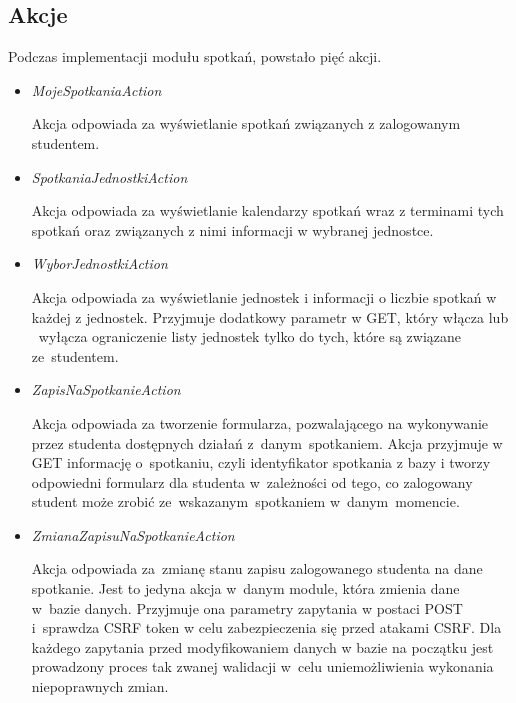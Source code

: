 \documentclass[licencjacka]{pracamgr}
\begin{document}
\subsection{Akcje}
Podczas implementacji modułu spotkań, powstało pięć akcji.
\begin{itemize}
\item{\textsl{MojeSpotkaniaAction}}

Akcja odpowiada za wyświetlanie spotkań związanych z zalogowanym studentem.
\item{\textsl{SpotkaniaJednostkiAction}}

Akcja odpowiada za wyświetlanie kalendarzy spotkań wraz z terminami tych spotkań oraz związanych z nimi informacji w wybranej jednostce.
\item{\textsl{WyborJednostkiAction}}

Akcja odpowiada za wyświetlanie jednostek i informacji o liczbie spotkań w każdej z jednostek. Przyjmuje dodatkowy parametr w GET, który włącza lub ~wyłącza ograniczenie listy jednostek tylko do tych, które są związane ze~studentem.
\item{\textsl{ZapisNaSpotkanieAction}}

Akcja odpowiada za tworzenie formularza, pozwalającego na wykonywanie przez studenta dostępnych działań z~danym~spotkaniem. Akcja przyjmuje w GET informację o~spotkaniu, czyli identyfikator spotkania z bazy i tworzy odpowiedni formularz dla studenta w~zależności od tego, co zalogowany student może zrobić ze~wskazanym~spotkaniem w~danym~momencie.
\item{\textsl{ZmianaZapisuNaSpotkanieAction}}

Akcja odpowiada za~zmianę stanu zapisu zalogowanego studenta na dane spotkanie. Jest to jedyna akcja w~danym module, która zmienia dane w~bazie danych. Przyjmuje ona parametry zapytania w postaci POST i~sprawdza CSRF token w celu zabezpieczenia się przed atakami CSRF. Dla każdego zapytania przed modyfikowaniem danych w bazie na początku jest prowadzony proces tak zwanej walidacji w~celu uniemożliwienia wykonania niepoprawnych zmian.
\end{itemize}
\end{document}
